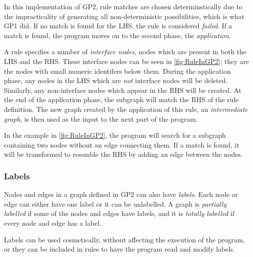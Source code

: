 \documentclass[authoryearcitations]{UoYCSproject}
\begin{document}
In this implementation of GP2, rule matches are chosen determinstically due to the
impracticality of generating all non-deterministic possibilities, which is what GP1 did.
If no match is found for the LHS, the rule is considered \emph{failed}. If a match is
found, the program moves on to the second phase, the \emph{application}.

A rule specifies a number of \emph{interface nodes}, nodes which are present in both
the LHS and the RHS. These interface nodes can be seen in \autoref{fig:RuleInGP2}; they
are the nodes with small numeric identifers below them. During the application phase,
any nodes in the LHS which are \emph{not} interface nodes will be deleted. Similarly,
any non-interface nodes which appear in the RHS will be created. At the end of the
application phase, the subgraph will match the RHS of the rule definition. The new
graph created by the application of this rule, an \emph{intermediate graph}, is then
used as the input to the next part of the program.

In the example in \autoref{fig:RuleInGP2}, the program will search for a subgraph
containing two nodes without an edge connecting them. If a match is found, it will
be transformed to resemble the RHS by adding an edge between the nodes.


\subsubsection{Labels}
\label{sec:Labels}

Nodes and edges in a graph defined in GP2 can also have \emph{labels}. Each node
or edge can either have one label or it can be unlabelled. A graph is
\emph{partially labelled} if some of the nodes and edges have labels, and it is
\emph{totally labelled} if every node and edge has a label.

Labels can be used cosmetically, without affecting the execution of the program,
or they can be included in rules to have the program read and modify labels.
\end{document}
